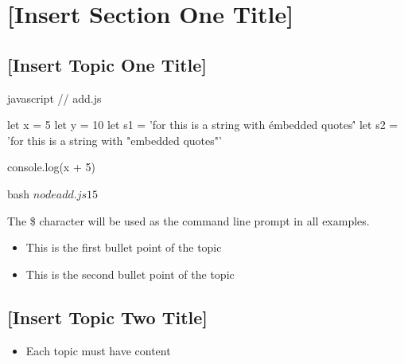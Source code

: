 \documentclass[../workbook]{subfiles}
\begin{document}
\section{[Insert Section One Title]}

\begin{sectiontopics}
\end{sectiontopics}



\subsection{[Insert Topic One Title]}


\begin{codeblock}{javascript}
// add.js

let x = 5
let y = 10
let s1 = 'for this is a string with \'embedded quotes\''
let s2 = 'for this is a string with "embedded quotes"'

console.log(x + 5) 
\end{codeblock}

\begin{codeblock}{bash}
$ node add.js
15
$
\end{codeblock}

\begin{displaynote}
The \$ character will be used as the command line prompt in all examples.
\end{displaynote}



\begin{itemize}
\item This is the first bullet point of the topic
\item This is the second bullet point of the topic
\end{itemize}



\subsection{[Insert Topic Two Title]}

\begin{itemize}
\item Each topic must have content
\end{itemize}
\end{document}
